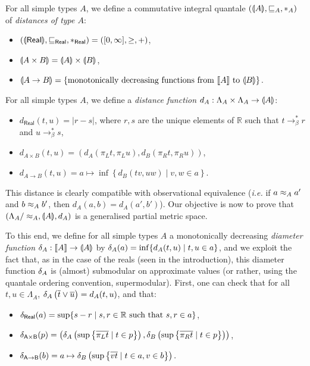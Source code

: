 For all simple types $A$, we define a commutative integral quantale $(\llparenthesis A \rrparenthesis, \sqsubseteq_A, \mathbin{\ast}_A)$ of \emph{distances of type $A$}:
\begin{itemize}
\item $(\llparenthesis \mathsf{Real} \rrparenthesis, \sqsubseteq_\mathsf{Real}, \mathbin{\ast}_\mathsf{Real}) = ([0,\infty], \geq, +)$,
\item $\llparenthesis A \times B \rrparenthesis = \llparenthesis A \rrparenthesis \times \llparenthesis B \rrparenthesis$,
\item $\llparenthesis A \to B \rrparenthesis = \{ \text{monotonically decreasing functions from } \llbracket A \rrbracket \text{ to } \llparenthesis B \rrparenthesis \}$.
\end{itemize}

For all simple types $A$, we define a \emph{distance function} $d_A : \Lambda_A \times \Lambda_A \to \llparenthesis A \rrparenthesis$:
\begin{itemize}
\item $d_\mathsf{Real}(t,u) = \left\vert r-s \right\vert$, where $r,s$ are the unique elements of $\mathbb{R}$ such that $t \to_\beta^* r$ and $u \to_\beta^* s$,
\item $d_{A \times B}(t,u) = (d_A(\pi_L t, \pi_L u), d_B(\pi_R t, \pi_R u))$,
\item $d_{A \to B}(t,u) = a \mapsto \inf \left\{ d_B(tv, uw) \mid v,w \in a \right\}$.
\end{itemize}

This distance is clearly compatible with observational equivalence (\textit{i.e.} if $a \approx_A a'$ and $b \approx_A b'$, then $d_A(a,b) = d_A(a',b')$). Our objective is now to prove that $\left(\Lambda_A/\approx_A, \llparenthesis A \rrparenthesis, d_A\right)$ is a generalised partial metric space.


To this end, we define for all simple types $A$ a monotonically decreasing \emph{diameter function} $\delta_A : \llbracket A \rrbracket \to \llparenthesis A \rrparenthesis$ by $\delta_A(a) = \inf \{ d_A(t,u) \mid t,u \in a \}$, and we exploit the fact that, as in the case of the reals (seen in the introduction), this diameter function $\delta_{A}$ is (almost) submodular on approximate values (or rather, using the quantale ordering convention, supermodular). First, one can check that for all $t,u \in \Lambda_A$, $\delta_A\left(\overline{t} \vee \overline{u}\right) = d_A(t,u)$, and that:
\begin{itemize}
\item $\delta_\mathsf{Real}(a) = \sup\{s-r \mid s,r \in \mathbb{R} \text{ such that } s,r \in a\}$,
\item $\delta_\mathsf{A \times B}(p) = \left(\delta_A\left(\sup\left\{\overline{\pi_L t} \mid t \in p\right\}\right), \delta_B\left(\sup\left\{\overline{\pi_R t} \mid t \in p\right\}\right)\right)$,
\item $\delta_\mathsf{A \to B}(b) = a \mapsto \delta_B\left(\sup\left\{\overline{vt} \mid t\in a, v \in b\right\}\right).$
\end{itemize}

